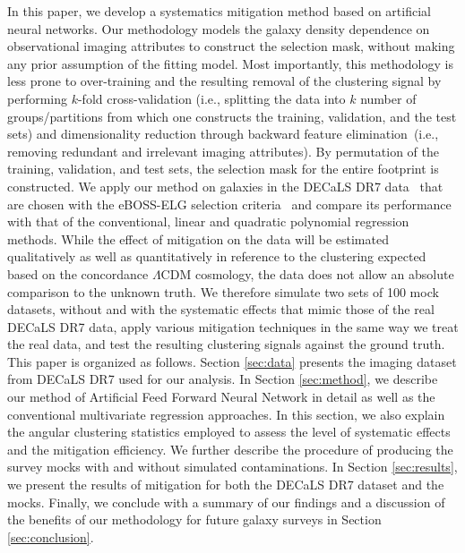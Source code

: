 \documentclass[fleqn, usenatbib]{mnras}
\begin{document}
In this paper, we develop a systematics mitigation method based on artificial neural networks. Our methodology models the galaxy density dependence on observational imaging attributes to construct the selection mask, without making any prior assumption of the fitting model. Most importantly, this methodology is less prone to over-training and the resulting removal of the clustering signal by performing $k$-fold cross-validation (i.e., splitting the data into $k$ number of groups/partitions from which one constructs the training, validation, and the test sets) and dimensionality reduction through backward feature elimination~(i.e., removing redundant and irrelevant imaging attributes)\citep[see e.g.,][]{devijver1982pattern, john1994irrelevant, koller1996toward, kohavi1997wrappers, ramaswamy2001multiclass, guyon2003introduction}.  By permutation of the training, validation, and test sets, the selection mask for the entire footprint is constructed.  We apply our method on galaxies in the DECaLS DR7 data~\citep{dey2018overview} that are chosen with the eBOSS-ELG selection criteria~\citep{Raichoor2017MNRAS.471.3955R} and compare its performance with that of the conventional, linear and quadratic polynomial regression methods. While the effect of mitigation on the data will be estimated qualitatively as well as quantitatively in reference to the clustering expected based on the concordance $\Lambda$CDM cosmology, the data does not allow an absolute comparison to the unknown truth. We therefore simulate two sets of 100 mock datasets, without and with the systematic effects that mimic those of the real DECaLS DR7 data, apply various mitigation techniques in the same way we treat the real data, and test the resulting clustering signals against the ground truth.\\


This paper is organized as follows. Section \ref{sec:data} presents the imaging dataset from DECaLS DR7 used for our analysis. In Section \ref{sec:method}, we describe our method of Artificial Feed Forward Neural Network in detail as well as the conventional multivariate regression approaches. In this section, we also explain the angular clustering statistics employed to assess the level of systematic effects and the mitigation efficiency. We further describe the procedure of producing the survey mocks with and without simulated contaminations. In Section \ref{sec:results}, we present the results of mitigation for both the DECaLS DR7 dataset and the mocks. Finally, we conclude with a summary of our findings and a discussion of the benefits of our methodology for future galaxy surveys in Section \ref{sec:conclusion}.\\
\end{document}
